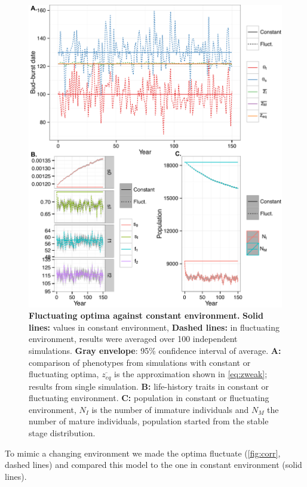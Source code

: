 \begin{figure}[ht!]
	\centering
	\includegraphics[scale=1]{Figures/PhenoLHTwithCorr.pdf}
	\caption{\textbf{Fluctuating optima against constant environment.} \textbf{Solid lines:} values in constant environment, \textbf{Dashed lines:} in fluctuating environment, results were averaged over 100 independent simulations. \textbf{Gray envelope}: 95\% confidence interval of average. \textbf{A:} comparison of phenotypes from simulations with constant or fluctuating optima, $\overline{z_{eq}}$ is the approximation shown in \autoref{eq:zweak}; results from single simulation. \textbf{B:} life-history traits in constant or fluctuating environment. \textbf{C:} population in constant or fluctuating environment, $N_I$ is the number of immature individuals and $N_M$ the number of mature individuals, population started from the stable stage distribution.}
	\label{fig:corr}
\end{figure}

To mimic a changing environment we made the optima fluctuate (\autoref{fig:corr}, dashed lines) and compared this model to the one in constant environment (solid lines).

